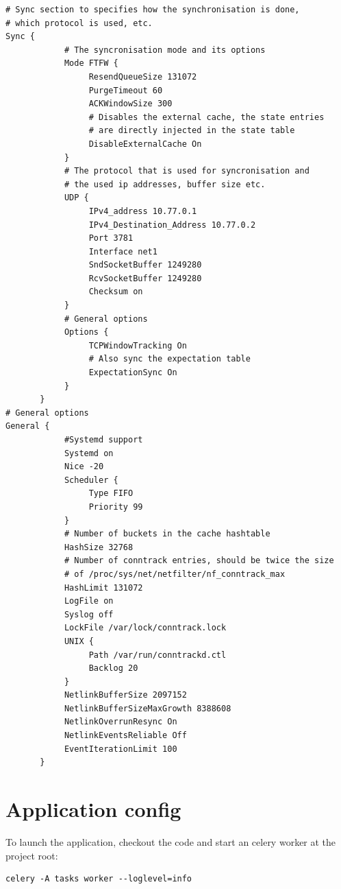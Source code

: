 \documentclass{report}
\begin{document}
\begingroup
\fontsize{9pt}{9pt}\selectfont
\begin{verbatim}
# Sync section to specifies how the synchronisation is done,
# which protocol is used, etc.
Sync {
            # The syncronisation mode and its options
            Mode FTFW {
                 ResendQueueSize 131072
                 PurgeTimeout 60
                 ACKWindowSize 300
                 # Disables the external cache, the state entries
                 # are directly injected in the state table
                 DisableExternalCache On
            }
            # The protocol that is used for syncronisation and
            # the used ip addresses, buffer size etc.
            UDP {
                 IPv4_address 10.77.0.1
                 IPv4_Destination_Address 10.77.0.2
                 Port 3781
                 Interface net1
                 SndSocketBuffer 1249280
                 RcvSocketBuffer 1249280
                 Checksum on
            }
            # General options
            Options {
                 TCPWindowTracking On
                 # Also sync the expectation table
                 ExpectationSync On
            }
       }
# General options
General {
            #Systemd support
            Systemd on
            Nice -20
            Scheduler {
                 Type FIFO
                 Priority 99
            }
            # Number of buckets in the cache hashtable
            HashSize 32768
            # Number of conntrack entries, should be twice the size
            # of /proc/sys/net/netfilter/nf_conntrack_max
            HashLimit 131072
            LogFile on
            Syslog off
            LockFile /var/lock/conntrack.lock
            UNIX {
                 Path /var/run/conntrackd.ctl
                 Backlog 20
            }
            NetlinkBufferSize 2097152
            NetlinkBufferSizeMaxGrowth 8388608
            NetlinkOverrunResync On
            NetlinkEventsReliable Off
            EventIterationLimit 100
       }
\end{verbatim}
\endgroup

\section{Application config}\label{celery-application}

To launch the application, checkout the code and start an celery worker at the project root:
\begingroup
\begin{verbatim}
celery -A tasks worker --loglevel=info
\end{verbatim}
\endgroup
\end{document}
